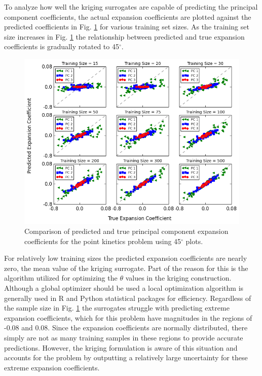 To analyze how well the kriging surrogates are capable of predicting the principal component coefficients, the actual expansion coefficients are plotted against the predicted coefficients in Fig. \ref{fig:pk_45degree} for various training set sizes. As the training set size increases in Fig. \ref{fig:pk_45degree} the relationship between predicted and true expansion coefficients is gradually rotated to 45$^\circ$.      
\begin{figure}[!h]
\caption{\label{fig:pk_45degree}
Comparison of predicted and true principal component expansion coefficients for the point kinetics problem using 45$^\circ$ plots.}
 \begin{center}
  \includegraphics[scale=.7]{./Chapter4/pk_45degree.png}
 \end{center}
\end{figure}
For relatively low training sizes the predicted expansion coefficients are nearly zero, the mean value of the kriging surrogate. Part of the reason for this is the algorithm utilized for optimizing the $\theta$ values in the kriging construction. Although a global optimizer should be used a local optimization algorithm is generally used in R \cite{R} and Python statistical packages for efficiency. Regardless of the sample size in Fig. \ref{fig:pk_45degree} the surrogates struggle with predicting extreme expansion coefficients, which for this problem have magnitudes in the regions of -0.08 and 0.08. Since the expansion coefficients are normally distributed, there simply are not as many training samples in these regions to provide accurate predictions. However, the kriging formulation is aware of this situation and accounts for the problem by outputting a relatively large uncertainty for these extreme expansion coefficients.   

 

